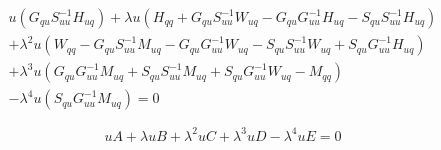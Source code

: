 \documentclass[a4paper,12p]{article}
\begin{document}
	\begin{equation}
	\begin{split}
	u(G_{qu}S_{uu}^{-1}H_{uq})
	+ \lambda u (H_{qq} + G_{qu}S_{uu}^{-1}W_{uq} - G_{qu}G_{uu}^{-1}H_{uq} - S_{qu}S_{uu}^{-1}H_{uq})\\
	+ \lambda^2 u (W_{qq} - G_{qu}S_{uu}^{-1}M_{uq} - G_{qu}G_{uu}^{-1}W_{uq} - S_{qu}S_{uu}^{-1}W_{uq} +  S_{qu}G_{uu}^{-1}H_{uq}) \\
	+ \lambda^3 u (G_{qu}G_{uu}^{-1}M_{uq} + S_{qu}S_{uu}^{-1}M_{uq} + S_{qu}G_{uu}^{-1}W_{uq} - M_{qq}) \\
	- \lambda^4 u (S_{qu}G_{uu}^{-1}M_{uq})
	= 0
	\end{split}
	\end{equation}
	
	\begin{equation}
	uA + \lambda u B + \lambda^2 u C + \lambda^3 u D - \lambda^4 u E = 0
	\end{equation}
	
	
\end{document}
